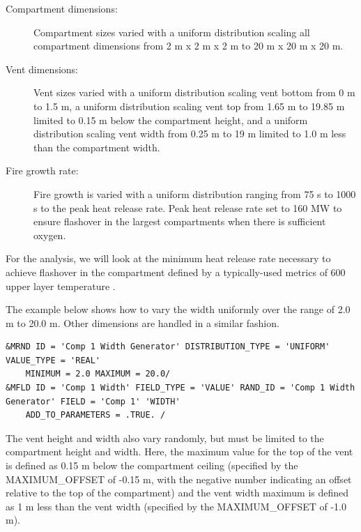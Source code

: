 \documentclass[12pt,twoside]{book}
\begin{document}
\begin{description}
\item[Compartment dimensions:] Compartment sizes varied with a uniform distribution scaling all compartment dimensions from 2 m x 2 m x 2 m to 20 m x 20 m x 20 m.
\item[Vent dimensions:] Vent sizes varied with a uniform distribution scaling vent bottom from 0 m to 1.5 m, a uniform distribution scaling vent top from 1.65 m to 19.85 m limited to 0.15 m below the compartment height, and a uniform distribution scaling vent width from 0.25 m to 19 m limited to 1.0 m less than the compartment width.
\item[Fire growth rate:] Fire growth is varied with a uniform distribution ranging from 75 s to 1000 s to
 the peak heat release rate. Peak heat release rate set to 160 MW to ensure flashover in the largest compartments when there is sufficient oxygen.
\end{description}

For the analysis, we will look at the minimum heat release rate necessary to achieve flashover in the compartment defined by a typically-used metrics of 600 \degc upper layer temperature \cite{Valid:Peacock_Flashover_1} \cite{Valid:Peacock_Flashover_2}.

The example below shows how to vary the width uniformly over the range of 2.0 m to 20.0 m. Other dimensions are handled in a similar fashion.

\vspace{\baselineskip}
\begin{lstlisting}
&MRND ID = 'Comp 1 Width Generator' DISTRIBUTION_TYPE = 'UNIFORM' VALUE_TYPE = 'REAL'
    MINIMUM = 2.0 MAXIMUM = 20.0/
&MFLD ID = 'Comp 1 Width' FIELD_TYPE = 'VALUE' RAND_ID = 'Comp 1 Width Generator' FIELD = 'Comp 1' 'WIDTH'
    ADD_TO_PARAMETERS = .TRUE. /
\end{lstlisting}

The vent height and width also vary randomly, but must be limited to the compartment height and width. Here, the maximum value for the top of the vent is defined as 0.15 m below the compartment ceiling (specified by the {\ct MAXIMUM\_OFFSET} of -0.15 m, with the negative number indicating an offset relative to the top of the compartment) and the vent width maximum is defined as 1 m less than the vent width (specified by the {\ct MAXIMUM\_OFFSET} of -1.0 m).
\end{document}
